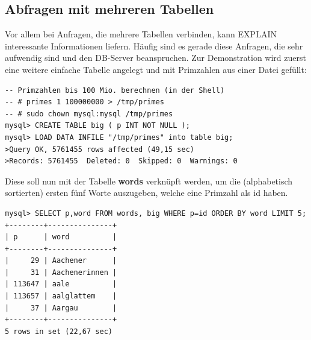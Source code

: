 \subsection{Abfragen mit mehreren Tabellen}
Vor allem bei Anfragen, die mehrere Tabellen verbinden, kann EXPLAIN interessante Informationen liefern. Häufig sind es gerade diese Anfragen, die sehr aufwendig sind und den DB-Server beanspruchen.
Zur Demonstration wird zuerst eine weitere einfache Tabelle angelegt und mit Primzahlen aus einer Datei gefüllt:
\begin{lstlisting}
-- Primzahlen bis 100 Mio. berechnen (in der Shell)
-- # primes 1 100000000 > /tmp/primes
-- # sudo chown mysql:mysql /tmp/primes
mysql> CREATE TABLE big ( p INT NOT NULL );
mysql> LOAD DATA INFILE "/tmp/primes" into table big;
>Query OK, 5761455 rows affected (49,15 sec)
>Records: 5761455  Deleted: 0  Skipped: 0  Warnings: 0
\end{lstlisting}
Diese soll nun mit der Tabelle \textbf{words} verknüpft werden, um die (alphabetisch sortierten) ersten fünf Worte auszugeben, welche eine Primzahl als id haben.\\
\begin{minipage}{\linewidth}
\begin{lstlisting}
mysql> SELECT p,word FROM words, big WHERE p=id ORDER BY word LIMIT 5;
+--------+---------------+
| p      | word          |
+--------+---------------+
|     29 | Aachener      |
|     31 | Aachenerinnen |
| 113647 | aale          |
| 113657 | aalglattem    |
|     37 | Aargau        |
+--------+---------------+
5 rows in set (22,67 sec)
\end{lstlisting}
\end{minipage}

